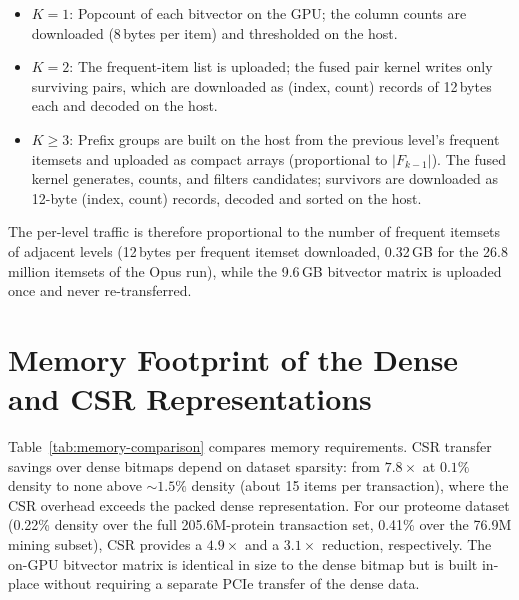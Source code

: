 \documentclass[10pt,a4paper,twocolumn]{article}
\begin{document}
\begin{itemize}[leftmargin=*]
    \item $K{=}1$: Popcount of each bitvector on the GPU; the column counts are downloaded (8\,bytes per item) and thresholded on the host.
    \item $K{=}2$: The frequent-item list is uploaded; the fused pair kernel writes only surviving pairs, which are downloaded as (index, count) records of 12\,bytes each and decoded on the host.
    \item $K{\geq}3$: Prefix groups are built on the host from the previous level's frequent itemsets and uploaded as compact arrays (proportional to $|F_{k-1}|$). The fused kernel generates, counts, and filters candidates; survivors are downloaded as 12-byte (index, count) records, decoded and sorted on the host.
\end{itemize}

\noindent The per-level traffic is therefore proportional to the number of frequent itemsets of adjacent levels (12\,bytes per frequent itemset downloaded, 0.32\,GB for the 26.8 million itemsets of the Opus run), while the 9.6\,GB bitvector matrix is uploaded once and never re-transferred.

\clearpage
\section{Memory Footprint of the Dense and CSR Representations}
\label{app:memory}

Table~\ref{tab:memory-comparison} compares memory requirements. CSR transfer savings over dense bitmaps depend on dataset sparsity: from $7.8\times$ at $0.1\%$ density to none above ${\sim}1.5\%$ density (about 15 items per transaction), where the CSR overhead exceeds the packed dense representation. For our proteome dataset (0.22\% density over the full 205.6M-protein transaction set, 0.41\% over the 76.9M mining subset), CSR provides a $4.9\times$ and a $3.1\times$ reduction, respectively. The on-GPU bitvector matrix is identical in size to the dense bitmap but is built in-place without requiring a separate PCIe transfer of the dense data.
\end{document}
